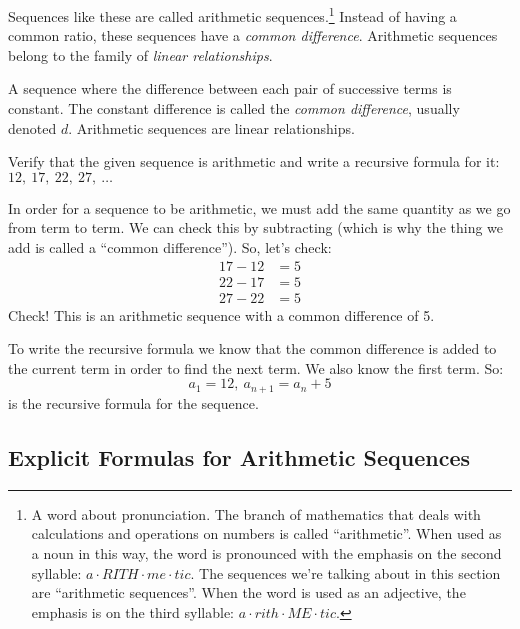 Sequences like these are called \glspl{arithmetic sequence}.\footnote{A word about pronunciation. The branch of mathematics that deals with calculations and operations on numbers is called ``arithmetic''. When used as a noun in this way, the word is pronounced with the emphasis on the second syllable: $a \cdot RITH \cdot me \cdot tic$. The sequences we're talking about in this section are ``arithmetic sequences''. When the word is used as an adjective, the emphasis is on the third syllable: $a \cdot rith \cdot ME \cdot tic$.} Instead of having a common ratio, these sequences have a \textit{common difference}. Arithmetic sequences belong to the family of \textit{linear relationships}.

\begin{boxeddef}
A sequence where the difference between each pair of successive terms is constant. The constant difference is called the \textit{common difference}, usually denoted $d$. Arithmetic sequences are linear relationships.
\end{boxeddef}

\begin{boxedex}
Verify that the given sequence is arithmetic and write a recursive formula for it: $12,~17,~ 22,~ 27,~\dotsc$

\exsoln{} In order for a sequence to be arithmetic, we must add the same quantity as we go from term to term. We can check this by subtracting (which is why the thing we add is called a ``common difference''). So, let's check: \[\begin{aligned}17-12 &= 5\\22-17 &= 5\\27-22 &= 5\end{aligned}\]
Check! This is an arithmetic sequence with a common difference of 5.

To write the recursive formula we know that the common difference is added to the current term in order to find the next term. We also know the first term. So: \[a_1 = 12, ~ a_{n+1} = a_n + 5\]
is the recursive formula for the sequence.
\end{boxedex}

\subsection{Explicit Formulas for Arithmetic Sequences}

